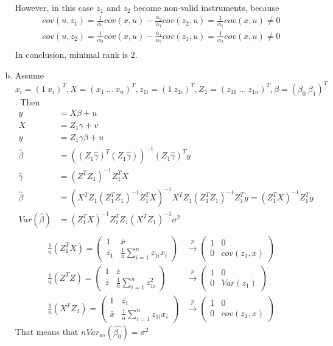 \documentclass[a4paper]{article}
\newcommand{\summa}{\sum_{i=1}^n}
\begin{document}
\begin{enumerate}[(a)]
	However, in this case $z_1$ and $z_2$ become non-valid instruments, because
	\begin{align*}
	cov(u, z_1) = \frac{1}{\alpha_1}cov(x, u) - \frac{\alpha_2}{\alpha_1}cov(z_2, u) = \frac{1}{\alpha_1}cov(x, u) \neq 0\\
	cov(u, z_2) = \frac{1}{\alpha_2}cov(x, u) - \frac{\alpha_1}{\alpha_2}cov(z_1, u)= \frac{1}{\alpha_2}cov(x, u) \neq 0\\
	\end{align*}
	In conclusion, minimal rank is 2.
	\item Assume $x_i = (1\ x_i)^T, X = (x_1\ \dots\ x_n)^T, z_{1i} = (1\ z_{1i})^T, Z_1 = (z_{11}\ \dots\ z_{1n})^T, \beta = (\beta_0\ \beta_1)^T$.
	Then 
	\begin{align*}
	y &= X\beta + u\\
	X &= Z_1\gamma + v\\
	y &= Z_1\gamma\beta + u\\
	\hat{\beta} &= ((Z_1\hat{\gamma})^T(Z_1\hat{\gamma}))^{-1}(Z_1\hat{\gamma})^Ty\\
	\hat{\gamma} &= (Z^TZ_1)^{-1}Z_1^TX\\
	\hat{\beta}&=(X^TZ_1(Z_1^TZ_1)^{-1}Z_1^TX)^{-1}X^TZ_1(Z_1^TZ_1)^{-1}Z_1^Ty = (Z_1^TX)^{-1}Z_1^Ty\\
	Var(\hat{\beta}) &= (Z_1^TX)^{-1}Z_1^TZ_1(X^TZ_1)^{-1}\sigma^2\\
	\end{align*}
	\begin{align*}
	\frac{1}{n}(Z_1^TX) = \begin{pmatrix}
	1 & \bar{x}\\
	\bar{z_1} & \frac{1}{n}\summa z_{1i}x_i
	\end{pmatrix} &\overset{p}{\to} \begin{pmatrix}
	1 & 0\\
	0 & cov(z_1, x)
	\end{pmatrix}\\
	\frac{1}{n}(Z^TZ) = \begin{pmatrix}
	1 & \bar{z}\\
	\bar{z} & \frac{1}{n}\summa z_{1i}^2
	\end{pmatrix} &\overset{p}{\to} \begin{pmatrix}
	1 & 0\\
	0 & Var(z_1)
	\end{pmatrix}\\
	\frac{1}{n} (X^TZ_1) = \begin{pmatrix}
	1 & \bar{z_1}\\
	\bar{x} & \frac{1}{n}\summa z_{1i}x_i
	\end{pmatrix} & \overset{p}{\to} \begin{pmatrix}
	1 & 0\\
	0 & cov(z_1, x)
	\end{pmatrix}
	\end{align*}
	That means that $n Var_{as}(\hat{\beta_0}) = \sigma^2$
	

\end{enumerate}
\end{document}
